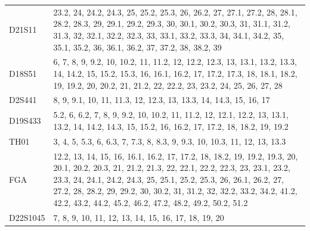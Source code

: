 \begin{theappendices}
\begin{table}
\begin{tabularx}{\textwidth}{lX}
  D21S11 &                                                                                   23.2, 24, 24.2, 24.3, 25, 25.2, 25.3, 26, 26.2, 27, 27.1, 27.2, 28, 28.1, 28.2, 28.3, 29, 29.1, 29.2, 29.3, 30, 30.1, 30.2, 30.3, 31, 31.1, 31.2, 31.3, 32, 32.1, 32.2, 32.3, 33, 33.1, 33.2, 33.3, 34, 34.1, 34.2, 35, 35.1, 35.2, 36, 36.1, 36.2, 37, 37.2, 38, 38.2, 39 \\
  D18S51 &                                                                                                                                    6, 7, 8, 9, 9.2, 10, 10.2, 11, 11.2, 12, 12.2, 12.3, 13, 13.1, 13.2, 13.3, 14, 14.2, 15, 15.2, 15.3, 16, 16.1, 16.2, 17, 17.2, 17.3, 18, 18.1, 18.2, 19, 19.2, 20, 20.2, 21, 21.2, 22, 22.2, 23, 23.2, 24, 25, 26, 27, 28 \\
  D2S441 &                                                                                                                                                                                                                                                                                            8, 9, 9.1, 10, 11, 11.3, 12, 12.3, 13, 13.3, 14, 14.3, 15, 16, 17 \\
 D19S433 &                                                                                                                                                                                                              5.2, 6, 6.2, 7, 8, 9, 9.2, 10, 10.2, 11, 11.2, 12, 12.1, 12.2, 13, 13.1, 13.2, 14, 14.2, 14.3, 15, 15.2, 16, 16.2, 17, 17.2, 18, 18.2, 19, 19.2 \\
    TH01 &                                                                                                                                                                                                                                                                                     3, 4, 5, 5.3, 6, 6.3, 7, 7.3, 8, 8.3, 9, 9.3, 10, 10.3, 11, 12, 13, 13.3 \\
     FGA & 12.2, 13, 14, 15, 16, 16.1, 16.2, 17, 17.2, 18, 18.2, 19, 19.2, 19.3, 20, 20.1, 20.2, 20.3, 21, 21.2, 21.3, 22, 22.1, 22.2, 22.3, 23, 23.1, 23.2, 23.3, 24, 24.1, 24.2, 24.3, 25, 25.1, 25.2, 25.3, 26, 26.1, 26.2, 27, 27.2, 28, 28.2, 29, 29.2, 30, 30.2, 31, 31.2, 32, 32.2, 33.2, 34.2, 41.2, 42.2, 43.2, 44.2, 45.2, 46.2, 47.2, 48.2, 49.2, 50.2, 51.2 \\
D22S1045 &                                                                                                                                                                                                                                                                                                          7, 8, 9, 10, 11, 12, 13, 14, 15, 16, 17, 18, 19, 20 \\

\end{tabularx}
\end{table}
\end{theappendices}
